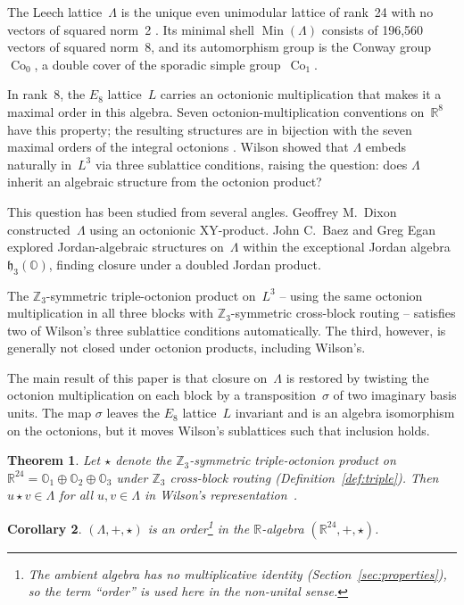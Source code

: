 \documentclass[twoside,english]{paper}
\numberwithin{equation}{section}
\numberwithin{figure}{section}
\newtheorem{theorem}{Theorem}[section]
\newtheorem{corollary}[theorem]{Corollary}
\theoremstyle{definition}
\theoremstyle{remark}
\newcommand{\OO}{\mathbb{O}}          %
\newcommand{\RR}{\mathbb{R}}
\newcommand{\ZZ}{\mathbb{Z}}
\newcommand{\LL}{\Lambda}             %
\DeclareMathOperator{\Co}{Co}
\begin{document}
The Leech lattice~$\LL$ is the unique even unimodular lattice of
rank~24 with no vectors of squared norm~2
\cite{ConwaySloane1999}.  Its minimal shell $\operatorname{Min}(\LL)$
consists of 196{,}560 vectors of squared norm~8, and its automorphism
group is the Conway group~$\Co_0$, a double cover of the sporadic
simple group~$\Co_1$.

In rank~8, the $E_8$ lattice~$L$ carries an octonionic multiplication
that makes it a maximal order in this algebra.
Seven octonion-multiplication conventions on~$\RR^8$ have this
property; the resulting structures are in bijection with the seven
maximal orders of the integral octonions
\cite{Coxeter1946, ConwaySmith2003}.  Wilson
\cite[Section~3]{Wilson2009} showed that $\LL$ embeds naturally
in~$L^3$ via three sublattice conditions, raising the question: does
$\LL$ inherit an algebraic structure from the octonion product?

This question has been studied from several angles.  Geoffrey
M.~Dixon \cite{Dixon2010} constructed~$\LL$ using an octonionic
XY-product.  John C.~Baez and Greg Egan \cite{Baez2014} explored
Jordan-algebraic structures on~$\LL$ within the exceptional Jordan
algebra~$\mathfrak{h}_3(\OO)$, finding closure under a doubled
Jordan product.

The $\ZZ_3$-symmetric triple-octonion product on~$L^3$ -- using the
same octonion multiplication in all three blocks with
$\ZZ_3$-symmetric cross-block routing -- satisfies two of Wilson's
three sublattice conditions automatically.  The third, however, is
generally not closed under octonion products, including Wilson's.

The main result of this paper is that closure on~$\LL$ is restored
by twisting the octonion multiplication on each block by a
transposition~$\sigma$ of two imaginary basis units.  The map
$\sigma$ leaves the $E_8$ lattice~$L$ invariant and is an algebra
isomorphism on the octonions, but it moves Wilson's sublattices
such that inclusion holds.

\begin{theorem}\label{thm:main}
Let\/ $\star$ denote the $\ZZ_3$-symmetric triple-octonion product
on~$\RR^{24} = \OO_1 \oplus \OO_2 \oplus \OO_3$
under $\ZZ_3$ cross-block routing (Definition~\ref{def:triple}).
Then $u \star v \in \LL$ for all $u, v \in \LL$ in Wilson's
representation~\cite{Wilson2009}.
\end{theorem}

\begin{corollary}\label{cor:order}
$(\LL, +, \star)$ is an order\footnote{The ambient algebra has no
multiplicative identity (Section~\ref{sec:properties}), so the term
``order'' is used here in the non-unital sense.} in the $\RR$-algebra
$(\RR^{24}, +, \star)$.
\end{corollary}
\end{document}
